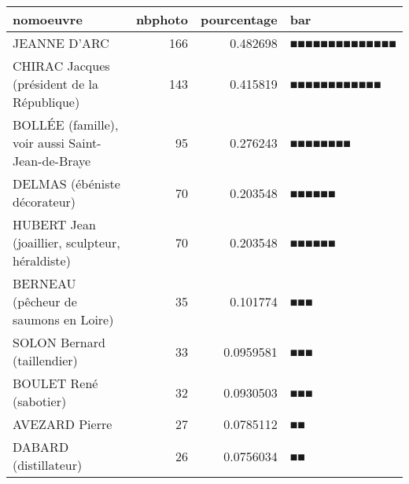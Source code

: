 \documentclass[11pt]{article}
\begin{document}
    \begin{tabular}{lrrl}
\toprule
 nomoeuvre                                        &   nbphoto &   pourcentage & bar            \\
\midrule
 JEANNE D'ARC                                     &       166 &     0.482698  & ■■■■■■■■■■■■■■ \\
 CHIRAC Jacques (président de la République)      &       143 &     0.415819  & ■■■■■■■■■■■■   \\
 BOLLÉE (famille), voir aussi Saint-Jean-de-Braye &        95 &     0.276243  & ■■■■■■■■       \\
 DELMAS (ébéniste décorateur)                     &        70 &     0.203548  & ■■■■■■         \\
 HUBERT Jean (joaillier, sculpteur, héraldiste)   &        70 &     0.203548  & ■■■■■■         \\
 BERNEAU (pêcheur de saumons en Loire)            &        35 &     0.101774  & ■■■            \\
 SOLON Bernard (taillendier)                      &        33 &     0.0959581 & ■■■            \\
 BOULET René (sabotier)                           &        32 &     0.0930503 & ■■■            \\
 AVEZARD Pierre                                   &        27 &     0.0785112 & ■■             \\
 DABARD (distillateur)                            &        26 &     0.0756034 & ■■             \\
\bottomrule
\end{tabular}
\end{document}

